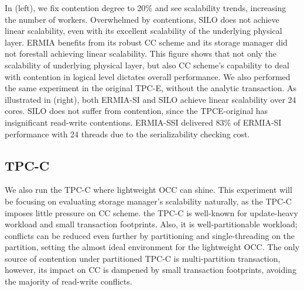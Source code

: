 In (left), we fix contention degree to 20\% and see scalability trends, increasing the number of workers. Overwhelmed by contentions, SILO does not achieve linear scalability, even with its excellent scalability of the underlying physical layer. ERMIA benefits from its robust CC scheme and its storage manager did not forestall achieving linear scalability. This figure shows that not only the scalability of underlying physical layer, but also CC scheme's capability to deal with contention in logical level dictates overall performance. We also performed the same experiment in the original TPC-E, without the analytic transaction. As illustrated in (right), both ERMIA-SI and SILO achieve linear scalability over 24 cores. SILO does not suffer from contention, since the TPCE-original has insignificant read-write contentions. ERMIA-SSI delivered 83\% of ERMIA-SI performance with 24 threads due to the serializability checking cost.

\subsection{TPC-C} 
We also run the TPC-C where lightweight OCC can shine. This experiment will be focusing on evaluating storage manager's scalability naturally, as the TPC-C imposes little pressure on CC scheme. the TPC-C is well-known for update-heavy workload and small transaction footprints. Also, it is well-partitionable workload; conflicts can be reduced even further by partitioning and single-threading on the partition, setting the almost ideal environment for the lightweight OCC. The only source of contention under partitioned TPC-C is multi-partition transaction, however, its impact on CC is dampened by small transaction footprints, avoiding the majority of read-write conflicts. 

